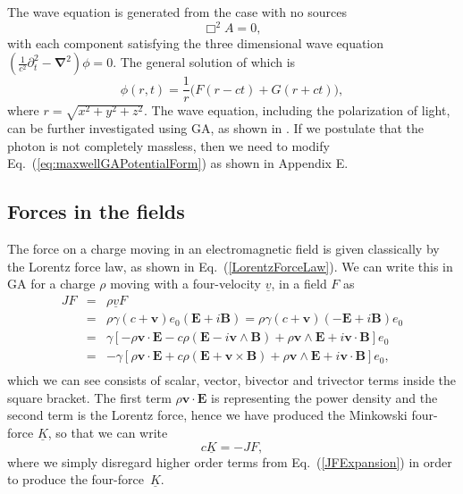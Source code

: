 \documentclass[12pt,aps,prb,preprint]{revtex4}   %
\newcommand{\be}{\begin{equation}}
\newcommand{\ee}{\end{equation}}
\newcommand{\bea}{\begin{eqnarray}}
\newcommand{\eea}{\end{eqnarray}}
\newcommand{\iGA}{{i}}
\begin{document}
The wave equation is generated from the case with no sources 
\be
\Box^2 A =  0 ,
\ee
with each component satisfying the three dimensional wave equation $ (\frac{1}{c^2} \partial_t^2 - \mathbf{\nabla}^2) \phi = 0 $.  The general solution of which is
\be \label{eq:WaveEquationGeneralSolution}
\phi(r,t) = \frac{1}{r} \big (F(r-ct) + G(r+ct) \big ),
\ee
where $ r =\sqrt{x^2+y^2+z^2} $.   The wave equation, including the polarization of light, can be further investigated using GA, as shown in \cite{Baylis:1992}. If we postulate that the photon is not completely massless, then we need to modify Eq.~(\ref{eq:maxwellGAPotentialForm}) as shown in Appendix E.


\subsection{Forces in the fields}

The force on a charge moving in an electromagnetic field is given classically by the Lorentz force law, as shown in Eq.~(\ref{LorentzForceLaw}).  We can write this in GA for a charge $ \rho $ moving with a four-velocity $ \underline{v} $, in a field $ F $ as
\bea \label{JFExpansion}
J  F & = & \rho \underline{v}  F  \\ \nonumber
& = &  \rho \gamma \left (c + \mathbf{v} \right ) e_0  \left (\mathbf{E} + \iGA \mathbf{B} \right ) =  \rho \gamma \left (c + \mathbf{v} \right ) \left (-\mathbf{E} + \iGA \mathbf{B} \right ) e_0  \\ \nonumber
& = & \gamma \left [-\rho \mathbf{v} \cdot \mathbf{E} - c \rho \left (\mathbf{E} - \iGA \mathbf{v} \wedge \mathbf{B} \right ) + \rho \mathbf{v} \wedge \textbf{E} + \iGA \mathbf{v} \cdot \textbf{B} \right ] e_0 \\ \nonumber
& = &  - \gamma \left [\rho \mathbf{v} \cdot \mathbf{E} + c \rho \left (\mathbf{E} + \mathbf{v} \times \mathbf{B} \right )  + \rho \mathbf{v} \wedge \textbf{E} + \iGA \mathbf{v} \cdot \textbf{B} \right ] e_0 , \\ \nonumber
\eea
which we can see consists of scalar, vector, bivector and trivector terms inside the square bracket.
The first term $ \rho \mathbf{v} \cdot \mathbf{E} $ is representing the power density and the second term is the Lorentz force, hence we have produced the Minkowski four-force $ \underline{K} $, so that we can write
\be \label{MinkowskiForce}
c \underline{K} =  - J F ,
\ee
where we simply disregard higher order terms from Eq.~(\ref{JFExpansion}) in order to produce the four-force~$ \underline{K} $.
\end{document}
